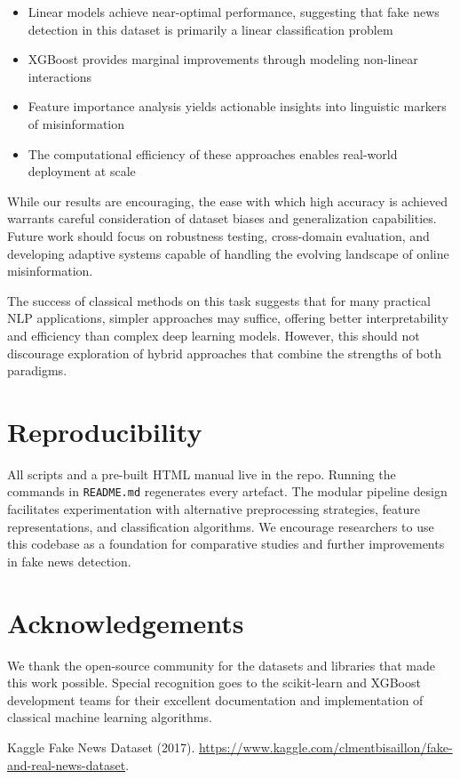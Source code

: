 \documentclass[11pt]{article}
\begin{document}
\begin{itemize}
\item Linear models achieve near-optimal performance, suggesting that fake news detection in this dataset is primarily a linear classification problem
\item XGBoost provides marginal improvements through modeling non-linear interactions
\item Feature importance analysis yields actionable insights into linguistic markers of misinformation
\item The computational efficiency of these approaches enables real-world deployment at scale
\end{itemize}

While our results are encouraging, the ease with which high accuracy is achieved warrants careful consideration of dataset biases and generalization capabilities. Future work should focus on robustness testing, cross-domain evaluation, and developing adaptive systems capable of handling the evolving landscape of online misinformation.

The success of classical methods on this task suggests that for many practical NLP applications, simpler approaches may suffice, offering better interpretability and efficiency than complex deep learning models. However, this should not discourage exploration of hybrid approaches that combine the strengths of both paradigms.

\section*{Reproducibility}
All scripts and a pre-built HTML manual live in the repo.
Running the commands in \texttt{README.md} regenerates every artefact. The modular pipeline design facilitates experimentation with alternative preprocessing strategies, feature representations, and classification algorithms. We encourage researchers to use this codebase as a foundation for comparative studies and further improvements in fake news detection.

\section*{Acknowledgements}
We thank the open-source community for the datasets and libraries that
made this work possible. Special recognition goes to the scikit-learn and XGBoost development teams for their excellent documentation and implementation of classical machine learning algorithms.


\begin{thebibliography}{1}

Kaggle Fake News Dataset (2017).
\newblock \url{https://www.kaggle.com/clmentbisaillon/fake-and-real-news-dataset}.

\end{thebibliography}
\end{document}
